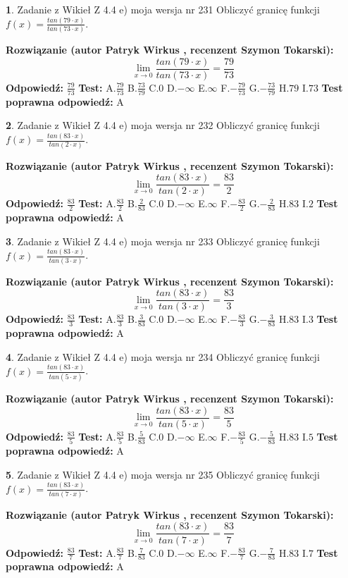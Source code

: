 \documentclass[12pt, a4paper]{article}
\theoremstyle{definition} %
\newtheorem{zad}{}
\newcommand{\zadStart}[1]{\begin{zad}#1\newline}
\newcommand{\zadStop}{\end{zad}}
\newcommand{\rozwStart}[2]{\noindent \textbf{Rozwiązanie (autor #1 , recenzent #2): }\newline}
\newcommand{\rozwStop}{\newline}
\newcommand{\odpStart}{\noindent \textbf{Odpowiedź:}\newline}
\newcommand{\odpStop}{\newline}
\newcommand{\testStart}{\noindent \textbf{Test:}\newline}
\newcommand{\testStop}{\newline}
\newcommand{\kluczStart}{\noindent \textbf{Test poprawna odpowiedź:}\newline}
\newcommand{\kluczStop}{\newline}
\begin{document}
\zadStart{Zadanie z Wikieł Z 4.4 e) moja wersja nr 231}
Obliczyć granicę funkcji $f(x)=\frac{tan(79\cdot x)}{tan(73\cdot x)}$.
\zadStop
\rozwStart{Patryk Wirkus}{Szymon Tokarski}
$$\lim\limits_{x\to 0}\frac{tan(79\cdot x)}{tan(73\cdot x)}=
\frac{79}{73}$$
\rozwStop
\odpStart
$\frac{79}{73}$
\odpStop
\testStart
A.$\frac{79}{73}$
B.$\frac{73}{79}$
C.$0$
D.$-\infty$
E.$\infty$
F.$-\frac{79}{73}$
G.$-\frac{73}{79}$
H.$79$
I.$73$
\testStop
\kluczStart
A
\kluczStop



\zadStart{Zadanie z Wikieł Z 4.4 e) moja wersja nr 232}
Obliczyć granicę funkcji $f(x)=\frac{tan(83\cdot x)}{tan(2\cdot x)}$.
\zadStop
\rozwStart{Patryk Wirkus}{Szymon Tokarski}
$$\lim\limits_{x\to 0}\frac{tan(83\cdot x)}{tan(2\cdot x)}=
\frac{83}{2}$$
\rozwStop
\odpStart
$\frac{83}{2}$
\odpStop
\testStart
A.$\frac{83}{2}$
B.$\frac{2}{83}$
C.$0$
D.$-\infty$
E.$\infty$
F.$-\frac{83}{2}$
G.$-\frac{2}{83}$
H.$83$
I.$2$
\testStop
\kluczStart
A
\kluczStop



\zadStart{Zadanie z Wikieł Z 4.4 e) moja wersja nr 233}
Obliczyć granicę funkcji $f(x)=\frac{tan(83\cdot x)}{tan(3\cdot x)}$.
\zadStop
\rozwStart{Patryk Wirkus}{Szymon Tokarski}
$$\lim\limits_{x\to 0}\frac{tan(83\cdot x)}{tan(3\cdot x)}=
\frac{83}{3}$$
\rozwStop
\odpStart
$\frac{83}{3}$
\odpStop
\testStart
A.$\frac{83}{3}$
B.$\frac{3}{83}$
C.$0$
D.$-\infty$
E.$\infty$
F.$-\frac{83}{3}$
G.$-\frac{3}{83}$
H.$83$
I.$3$
\testStop
\kluczStart
A
\kluczStop



\zadStart{Zadanie z Wikieł Z 4.4 e) moja wersja nr 234}
Obliczyć granicę funkcji $f(x)=\frac{tan(83\cdot x)}{tan(5\cdot x)}$.
\zadStop
\rozwStart{Patryk Wirkus}{Szymon Tokarski}
$$\lim\limits_{x\to 0}\frac{tan(83\cdot x)}{tan(5\cdot x)}=
\frac{83}{5}$$
\rozwStop
\odpStart
$\frac{83}{5}$
\odpStop
\testStart
A.$\frac{83}{5}$
B.$\frac{5}{83}$
C.$0$
D.$-\infty$
E.$\infty$
F.$-\frac{83}{5}$
G.$-\frac{5}{83}$
H.$83$
I.$5$
\testStop
\kluczStart
A
\kluczStop



\zadStart{Zadanie z Wikieł Z 4.4 e) moja wersja nr 235}
Obliczyć granicę funkcji $f(x)=\frac{tan(83\cdot x)}{tan(7\cdot x)}$.
\zadStop
\rozwStart{Patryk Wirkus}{Szymon Tokarski}
$$\lim\limits_{x\to 0}\frac{tan(83\cdot x)}{tan(7\cdot x)}=
\frac{83}{7}$$
\rozwStop
\odpStart
$\frac{83}{7}$
\odpStop
\testStart
A.$\frac{83}{7}$
B.$\frac{7}{83}$
C.$0$
D.$-\infty$
E.$\infty$
F.$-\frac{83}{7}$
G.$-\frac{7}{83}$
H.$83$
I.$7$
\testStop
\kluczStart
A
\kluczStop
\end{document}
